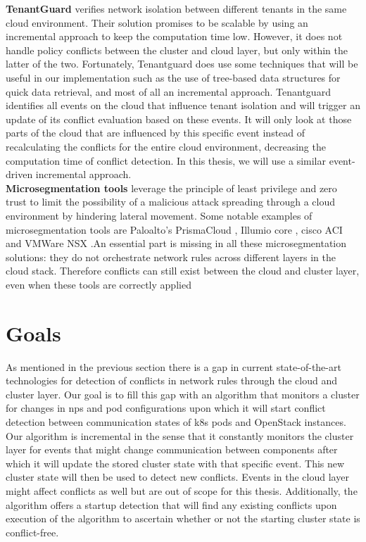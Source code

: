 \textbf{TenantGuard} \cite{tenantguard} verifies network isolation between different tenants in the same cloud environment. Their solution promises to be scalable by using an incremental approach to keep the computation time low. However, it does not handle policy conflicts between the cluster and cloud layer, but only within the latter of the two. Fortunately, Tenantguard does use some techniques that will be useful in our implementation such as the use of tree-based data structures for quick data retrieval, and most of all an incremental approach. Tenantguard identifies all events on the cloud that influence tenant isolation and will trigger an update of its conflict evaluation based on these events. It will only look at those parts of the cloud that are influenced by this specific event instead of recalculating the conflicts for the entire cloud environment, decreasing the computation time of conflict detection. In this thesis, we will use a similar event-driven incremental approach.
\\[10pt]

\textbf{Microsegmentation tools} leverage the principle of least privilege \cite{leastprivilige} and zero trust \cite{trust} to limit the possibility of a malicious attack spreading through a cloud environment by hindering lateral movement. Some notable examples of microsegmentation tools are Paloalto's PrismaCloud \cite{prismacloud}, Illumio core \cite{illumio}, cisco ACI \cite{ciscoaci} and VMWare NSX \cite{vmwarensx}.An essential part is missing in all these microsegmentation solutions: they do not orchestrate network rules across different layers in the cloud stack. Therefore conflicts can  still exist between the cloud and cluster layer, even when these tools are correctly applied 

\section{Goals} \label{sec:goals}
As mentioned in the previous section there is a gap in current state-of-the-art technologies for detection of conflicts in network rules through the cloud and cluster layer. Our goal is to fill this gap with an algorithm that monitors a cluster for changes in \acrshort{np}s and pod configurations upon which it will start conflict detection between communication states of \acrshort{k8s} pods and OpenStack instances. Our algorithm is incremental in the sense that it constantly monitors the cluster layer for events that might change communication between components after which it will update the stored cluster state with that specific event. This new cluster state will then be used to detect new conflicts. Events in the cloud layer might affect conflicts as well but are out of scope for this thesis. Additionally, the algorithm offers a startup detection that will find any existing conflicts upon execution of the algorithm to ascertain whether or not the starting cluster state is conflict-free.
\\[10pt]

